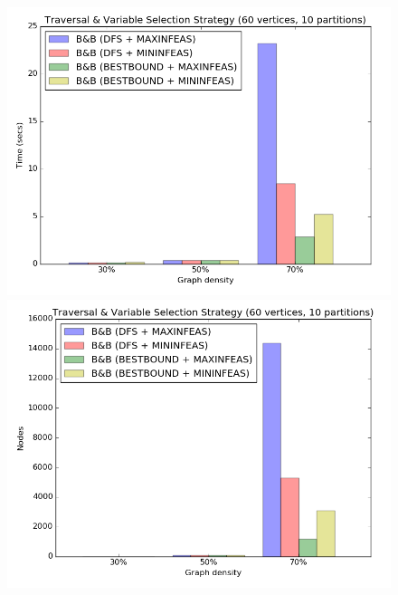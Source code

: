 \begin{figure}[h]
  \centering
  \begin{minipage}[b]{0.49\textwidth}
    \includegraphics[width=\textwidth]{img/9-tree_v60_p10_i1_l30_s1.png}
  \end{minipage}
  \hfill
  \begin{minipage}[b]{0.49\textwidth}
    \includegraphics[width=\textwidth]{img/9-tree_v60_p10_i1_l30_s1_nodes.png}
  \end{minipage}
  \begin{minipage}[b]{0.49\textwidth}

\end{minipage}
\end{figure}
